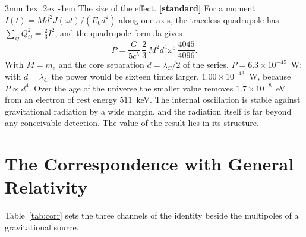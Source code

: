 \documentclass[%
 reprint, amsmath,amssymb, aps, prb, ]{revtex4-2}
\makeatletter
\numberwithin{equation}{section}
\renewcommand\paragraph{%
  \@startsection{paragraph}{4}{\z@}%
    {3mm \@plus 1ex \@minus .2ex}%
    {-1em}%
    {\normalfont\normalsize\itshape}}
\makeatother
\begin{document}
\paragraph{The size of the effect.} \textbf{[standard]} For a moment $I(t) = M d^2 J(\omega t)/(E_0d^2)$ along one axis, the traceless quadrupole has $\sum_{ij}Q_{ij}^2 = \tfrac23 I^2$, and the quadrupole formula gives
\begin{equation}
P = \frac{G}{5c^5}\,\frac23\,M^2d^4\omega^6\,\frac{4045}{4096}.
\label{eq:P}
\end{equation}
With $M = m_e$ and the core separation $d = \lambda_C/2$ of the series, $P = 6.3\times10^{-45}$~W; with $d = \lambda_C$ the power would be sixteen times larger, $1.00\times10^{-43}$~W, because $P \propto d^4$. Over the age of the universe the smaller value removes $1.7\times10^{-8}$~eV from an electron of rest energy $511$~keV. The internal oscillation is stable against gravitational radiation by a wide margin, and the radiation itself is far beyond any conceivable detection. The value of the result lies in its structure.

\section{The Correspondence with General Relativity}
\label{sec:gr}

Table~\ref{tab:corr} sets the three channels of the identity beside the multipoles of a gravitational source.
\end{document}
